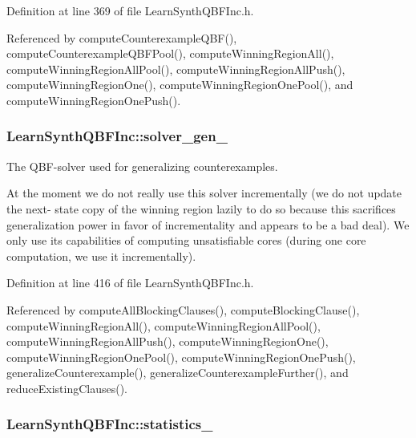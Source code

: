 Definition at line 369 of file Learn\-Synth\-Q\-B\-F\-Inc.\-h.



Referenced by compute\-Counterexample\-Q\-B\-F(), compute\-Counterexample\-Q\-B\-F\-Pool(), compute\-Winning\-Region\-All(), compute\-Winning\-Region\-All\-Pool(), compute\-Winning\-Region\-All\-Push(), compute\-Winning\-Region\-One(), compute\-Winning\-Region\-One\-Pool(), and compute\-Winning\-Region\-One\-Push().

\hypertarget{classLearnSynthQBFInc_ab5efae34f9ecd320b38f515c5ae6111d}{
\subsubsection[{solver\-\_\-gen\-\_\-}]{ Learn\-Synth\-Q\-B\-F\-Inc\-::solver\-\_\-gen\-\_\-\hspace{0.3cm}{\ttfamily [protected]}}}\label{classLearnSynthQBFInc_ab5efae34f9ecd320b38f515c5ae6111d}


The Q\-B\-F-\/solver used for generalizing counterexamples. 

At the moment we do not really use this solver incrementally (we do not update the next-\/ state copy of the winning region lazily to do so because this sacrifices generalization power in favor of incrementality and appears to be a bad deal). We only use its capabilities of computing unsatisfiable cores (during one core computation, we use it incrementally). 

Definition at line 416 of file Learn\-Synth\-Q\-B\-F\-Inc.\-h.



Referenced by compute\-All\-Blocking\-Clauses(), compute\-Blocking\-Clause(), compute\-Winning\-Region\-All(), compute\-Winning\-Region\-All\-Pool(), compute\-Winning\-Region\-All\-Push(), compute\-Winning\-Region\-One(), compute\-Winning\-Region\-One\-Pool(), compute\-Winning\-Region\-One\-Push(), generalize\-Counterexample(), generalize\-Counterexample\-Further(), and reduce\-Existing\-Clauses().

\hypertarget{classLearnSynthQBFInc_a1f8d3bd97419754ef72759bdda766db4}{
\subsubsection[{statistics\-\_\-}]{ Learn\-Synth\-Q\-B\-F\-Inc\-::statistics\-\_\-\hspace{0.3cm}{\ttfamily [protected]}}}\label{classLearnSynthQBFInc_a1f8d3bd97419754ef72759bdda766db4}


